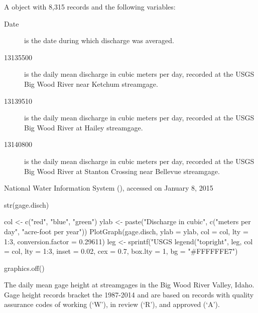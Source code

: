 \documentclass[letterpaper]{book}
\begin{document}
\begin{Format}
A  object with 8,315 records and the following variables:
\begin{description}

\item[Date] is the date during which discharge was averaged.
\item[13135500] is the daily mean discharge in cubic meters per day, recorded at the USGS  Big Wood River near Ketchum streamgage.
\item[13139510] is the daily mean discharge in cubic meters per day, recorded at the USGS  Big Wood River at Hailey streamgage.
\item[13140800] is the daily mean discharge in cubic meters per day, recorded at the USGS  Big Wood River at Stanton Crossing near Bellevue streamgage.

\end{description}

\end{Format}
%
\begin{Source}\relax
National Water Information System (), accessed on January 8, 2015
\end{Source}
%
\begin{Examples}
\begin{ExampleCode}
str(gage.disch)

col <- c("red", "blue", "green")
ylab <- paste("Discharge in cubic", c("meters per day", "acre-foot per year"))
PlotGraph(gage.disch, ylab = ylab, col = col, lty = 1:3, conversion.factor = 0.29611)
leg <- sprintf("USGS %
legend("topright", leg, col = col, lty = 1:3, inset = 0.02, cex = 0.7,
       box.lty = 1, bg = "#FFFFFFE7")

graphics.off()
\end{ExampleCode}
\end{Examples}
%
\begin{Description}\relax
The daily mean gage height at streamgages in the Big Wood River Valley, Idaho.
Gage height records bracket the 1987-2014 and are based on records with quality assurance codes of working (`W'), in review (`R'), and approved (`A').

\end{Description}
\end{document}
